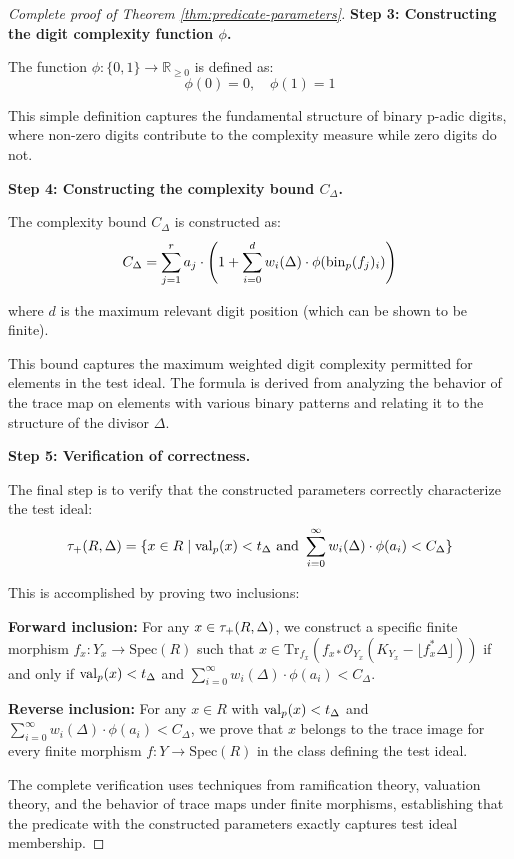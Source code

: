 \begin{proof}[Complete proof of Theorem \ref{thm:predicate-parameters}]
\textbf{Step 3: Constructing the digit complexity function $\phi$.}

The function $\phi: \{0,1\} \to \mathbb{R}_{\geq 0}$ is defined as:
$$\phi(0) = 0, \quad \phi(1) = 1$$

This simple definition captures the fundamental structure of binary p-adic digits, where non-zero digits contribute to the complexity measure while zero digits do not.

\textbf{Step 4: Constructing the complexity bound $C_\Delta$.}

The complexity bound $C_\Delta$ is constructed as:
$$C_\Delta = \sum_{j=1}^{r} a_j \cdot \left( 1 + \sum_{i=0}^{d} w_i(\Delta) \cdot \phi(\operatorname{bin}_p(f_j)_i) \right)$$

where $d$ is the maximum relevant digit position (which can be shown to be finite).

This bound captures the maximum weighted digit complexity permitted for elements in the test ideal. The formula is derived from analyzing the behavior of the trace map on elements with various binary patterns and relating it to the structure of the divisor $\Delta$.

\textbf{Step 5: Verification of correctness.}

The final step is to verify that the constructed parameters correctly characterize the test ideal:
$$\tau_+(R,\Delta) = \{x \in R \mid \operatorname{val}_p(x) < t_\Delta \text{ and } \sum_{i=0}^{\infty} w_i(\Delta) \cdot \phi(a_i) < C_\Delta\}$$

This is accomplished by proving two inclusions:

\textbf{Forward inclusion:} For any $x \in \tau_+(R,\Delta)$, we construct a specific finite morphism $f_x: Y_x \to \text{Spec}(R)$ such that $x \in \text{Tr}_{f_x}(f_{x*}\mathcal{O}_{Y_x}(K_{Y_x} - \lfloor f_x^*\Delta\rfloor))$ if and only if $\operatorname{val}_p(x) < t_\Delta$ and $\sum_{i=0}^{\infty} w_i(\Delta) \cdot \phi(a_i) < C_\Delta$.

\textbf{Reverse inclusion:} For any $x \in R$ with $\operatorname{val}_p(x) < t_\Delta$ and $\sum_{i=0}^{\infty} w_i(\Delta) \cdot \phi(a_i) < C_\Delta$, we prove that $x$ belongs to the trace image for every finite morphism $f: Y \to \text{Spec}(R)$ in the class defining the test ideal.

The complete verification uses techniques from ramification theory, valuation theory, and the behavior of trace maps under finite morphisms, establishing that the predicate with the constructed parameters exactly captures test ideal membership.
\end{proof}

